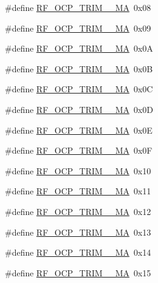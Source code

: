 \begin{DoxyCompactItemize}
\item 
\#define \mbox{\hyperlink{sx1276_regs-_fsk_8h_a457a3f7221afb38da84a69a8745e53b6}{R\+F\+\_\+\+O\+C\+P\+\_\+\+T\+R\+I\+M\+\_\+\_\+\+MA}}~0x08
\item 
\#define \mbox{\hyperlink{sx1276_regs-_fsk_8h_aae9790e06b8eb78619b36ddac797362d}{R\+F\+\_\+\+O\+C\+P\+\_\+\+T\+R\+I\+M\+\_\+\_\+\+MA}}~0x09
\item 
\#define \mbox{\hyperlink{sx1276_regs-_fsk_8h_a26174898b5ac7efce60f4b347910b1ca}{R\+F\+\_\+\+O\+C\+P\+\_\+\+T\+R\+I\+M\+\_\+\_\+\+MA}}~0x0A
\item 
\#define \mbox{\hyperlink{sx1276_regs-_fsk_8h_a1387ca1b80a4984a2de36325743a6050}{R\+F\+\_\+\+O\+C\+P\+\_\+\+T\+R\+I\+M\+\_\+\_\+\+MA}}~0x0B
\item 
\#define \mbox{\hyperlink{sx1276_regs-_fsk_8h_a87c78055bb1ff7e9f72416324d1afa5f}{R\+F\+\_\+\+O\+C\+P\+\_\+\+T\+R\+I\+M\+\_\+\_\+\+MA}}~0x0C
\item 
\#define \mbox{\hyperlink{sx1276_regs-_fsk_8h_aec4e8936c74d0338b33f7c5201a13007}{R\+F\+\_\+\+O\+C\+P\+\_\+\+T\+R\+I\+M\+\_\+\_\+\+MA}}~0x0D
\item 
\#define \mbox{\hyperlink{sx1276_regs-_fsk_8h_ac48e4dd5062ac350432eadd140ba12fe}{R\+F\+\_\+\+O\+C\+P\+\_\+\+T\+R\+I\+M\+\_\+\_\+\+MA}}~0x0E
\item 
\#define \mbox{\hyperlink{sx1276_regs-_fsk_8h_abc2ff6a69d2a51ea5b724ca790af57bc}{R\+F\+\_\+\+O\+C\+P\+\_\+\+T\+R\+I\+M\+\_\+\_\+\+MA}}~0x0F
\item 
\#define \mbox{\hyperlink{sx1276_regs-_fsk_8h_a86b4c20cd2573e3fa003699d26e9dec5}{R\+F\+\_\+\+O\+C\+P\+\_\+\+T\+R\+I\+M\+\_\+\_\+\+MA}}~0x10
\item 
\#define \mbox{\hyperlink{sx1276_regs-_fsk_8h_ac7e461bc044a8ce5c11b3c944da839a0}{R\+F\+\_\+\+O\+C\+P\+\_\+\+T\+R\+I\+M\+\_\+\_\+\+MA}}~0x11
\item 
\#define \mbox{\hyperlink{sx1276_regs-_fsk_8h_a353421d2bcb86f0e10738e847ee7cc33}{R\+F\+\_\+\+O\+C\+P\+\_\+\+T\+R\+I\+M\+\_\+\_\+\+MA}}~0x12
\item 
\#define \mbox{\hyperlink{sx1276_regs-_fsk_8h_aff8239a2ad3878879cafc1766f7706df}{R\+F\+\_\+\+O\+C\+P\+\_\+\+T\+R\+I\+M\+\_\+\_\+\+MA}}~0x13
\item 
\#define \mbox{\hyperlink{sx1276_regs-_fsk_8h_a71ddc55ff41ffa8eed9f84918e12f8d2}{R\+F\+\_\+\+O\+C\+P\+\_\+\+T\+R\+I\+M\+\_\+\_\+\+MA}}~0x14
\item 
\#define \mbox{\hyperlink{sx1276_regs-_fsk_8h_a45b10e117bee9e321a4b5addb46a45f8}{R\+F\+\_\+\+O\+C\+P\+\_\+\+T\+R\+I\+M\+\_\+\_\+\+MA}}~0x15

\end{DoxyCompactItemize}
